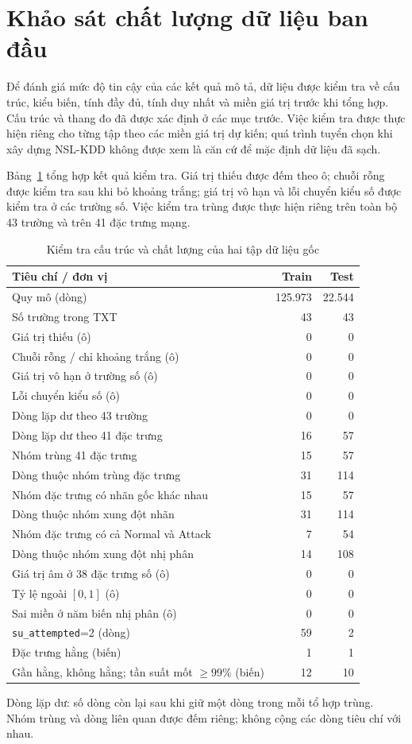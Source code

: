 \section{Khảo sát chất lượng dữ liệu ban đầu}
Để đánh giá mức độ tin cậy của các kết quả mô tả, dữ liệu được kiểm tra về cấu trúc, kiểu biến, tính đầy đủ, tính duy nhất và miền giá trị trước khi tổng hợp. Cấu trúc và thang đo đã được xác định ở các mục trước. Việc kiểm tra được thực hiện riêng cho từng tập theo các miền giá trị dự kiến; quá trình tuyển chọn khi xây dựng NSL-KDD không được xem là căn cứ để mặc định dữ liệu đã sạch.

Bảng~\ref{tab:t2:quality} tổng hợp kết quả kiểm tra. Giá trị thiếu được đếm theo ô; chuỗi rỗng được kiểm tra sau khi bỏ khoảng trắng; giá trị vô hạn và lỗi chuyển kiểu số được kiểm tra ở các trường số. Việc kiểm tra trùng được thực hiện riêng trên toàn bộ 43 trường và trên 41 đặc trưng mạng.
\begin{table}[H]
\centering
\caption{Kiểm tra cấu trúc và chất lượng của hai tập dữ liệu gốc}
\label{tab:t2:quality}
\small
\setlength{\tabcolsep}{3pt}
\begin{tabular}{p{10.1cm}rr}
\toprule
Tiêu chí / đơn vị & Train & Test \\
\midrule
Quy mô (dòng) & 125.973 & 22.544 \\
Số trường trong TXT & 43 & 43 \\
Giá trị thiếu (ô) & 0 & 0 \\
Chuỗi rỗng / chỉ khoảng trắng (ô) & 0 & 0 \\
Giá trị vô hạn ở trường số (ô) & 0 & 0 \\
Lỗi chuyển kiểu số (ô) & 0 & 0 \\
Dòng lặp dư theo 43 trường & 0 & 0 \\
Dòng lặp dư theo 41 đặc trưng & 16 & 57 \\
Nhóm trùng 41 đặc trưng & 15 & 57 \\
Dòng thuộc nhóm trùng đặc trưng & 31 & 114 \\
Nhóm đặc trưng có nhãn gốc khác nhau & 15 & 57 \\
Dòng thuộc nhóm xung đột nhãn & 31 & 114 \\
Nhóm đặc trưng có cả Normal và Attack & 7 & 54 \\
Dòng thuộc nhóm xung đột nhị phân & 14 & 108 \\
Giá trị âm ở 38 đặc trưng số (ô) & 0 & 0 \\
Tỷ lệ ngoài $[0,1]$ (ô) & 0 & 0 \\
Sai miền ở năm biến nhị phân (ô) & 0 & 0 \\
\texttt{su\_attempted}=2 (dòng) & 59 & 2 \\
Đặc trưng hằng (biến) & 1 & 1 \\
Gần hằng, không hằng; tần suất mốt $\geq99\%$ (biến) & 12 & 10 \\
\bottomrule
\end{tabular}
\par\smallskip\footnotesize Dòng lặp dư: số dòng còn lại sau khi giữ một dòng trong mỗi tổ hợp trùng. Nhóm trùng và dòng liên quan được đếm riêng; không cộng các dòng tiêu chí với nhau.
\end{table}
